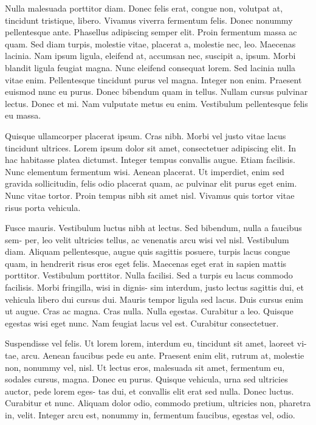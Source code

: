 \documentclass[11pt]{article}
\begin{document}
Nulla malesuada porttitor diam. Donec felis erat, congue non, volutpat at, tincidunt tristique, libero. Vivamus viverra fermentum felis. Donec nonummy pellentesque ante. Phasellus adipiscing semper elit. Proin fermentum massa ac quam. Sed diam turpis, molestie vitae, placerat a, molestie nec, leo. Maecenas lacinia. Nam ipsum ligula, eleifend at, accumsan nec, suscipit a, ipsum. Morbi blandit ligula feugiat magna. Nunc eleifend consequat lorem. Sed lacinia nulla vitae enim. Pellentesque tincidunt purus vel magna. Integer non enim. Praesent euismod nunc eu purus. Donec bibendum quam in tellus. Nullam cursus pulvinar lectus. Donec et mi. Nam vulputate metus eu enim. Vestibulum pellentesque felis eu massa.

Quisque ullamcorper placerat ipsum. Cras nibh. Morbi vel justo vitae lacus tincidunt ultrices. Lorem ipsum dolor sit amet, consectetuer adipiscing elit. In hac habitasse platea dictumst. Integer tempus convallis augue. Etiam facilisis. Nunc elementum fermentum wisi. Aenean placerat. Ut imperdiet, enim sed gravida sollicitudin, felis odio placerat quam, ac pulvinar elit purus eget enim. Nunc vitae tortor. Proin tempus nibh sit amet nisl. Vivamus quis tortor vitae risus porta vehicula.

Fusce mauris. Vestibulum luctus nibh at lectus. Sed bibendum, nulla a faucibus sem- per, leo velit ultricies tellus, ac venenatis arcu wisi vel nisl. Vestibulum diam. Aliquam pellentesque, augue quis sagittis posuere, turpis lacus congue quam, in hendrerit risus eros eget felis. Maecenas eget erat in sapien mattis porttitor. Vestibulum porttitor. Nulla facilisi. Sed a turpis eu lacus commodo facilisis. Morbi fringilla, wisi in dignis- sim interdum, justo lectus sagittis dui, et vehicula libero dui cursus dui. Mauris tempor ligula sed lacus. Duis cursus enim ut augue. Cras ac magna. Cras nulla. Nulla egestas. Curabitur a leo. Quisque egestas wisi eget nunc. Nam feugiat lacus vel est. Curabitur consectetuer.

Suspendisse vel felis. Ut lorem lorem, interdum eu, tincidunt sit amet, laoreet vi- tae, arcu. Aenean faucibus pede eu ante. Praesent enim elit, rutrum at, molestie non, nonummy vel, nisl. Ut lectus eros, malesuada sit amet, fermentum eu, sodales cursus, magna. Donec eu purus. Quisque vehicula, urna sed ultricies auctor, pede lorem eges- tas dui, et convallis elit erat sed nulla. Donec luctus. Curabitur et nunc. Aliquam dolor odio, commodo pretium, ultricies non, pharetra in, velit. Integer arcu est, nonummy in, fermentum faucibus, egestas vel, odio.
\end{document}
